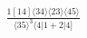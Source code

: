 \documentclass[varwidth, border=5pt]{standalone}
\begin{document}
\begin{my}
$\begin{gathered}
\scriptscriptstyle\frac{1[14]⟨34⟩⟨23⟩⟨45⟩}{⟨35⟩^3⟨4|1+2|4]}
\end{gathered}$
\end{my}
\end{document}
